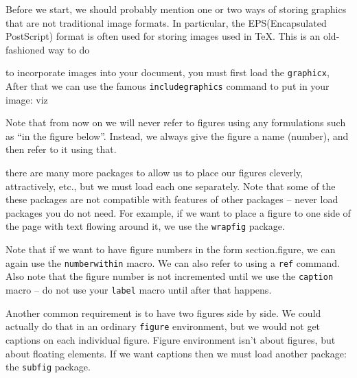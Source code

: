 \documentclass[12pt, leqno]{article}
\numberwithin{equation}{section}
\numberwithin{figure}{section}
\begin{document}
Before we start, we should probably mention one or two ways of storing graphics that are not traditional 
image formats. In particular, the EPS(Encapsulated PostScript) format is often used for storing images used in \TeX. 
This is an old-fashioned way to do 
 
to incorporate images into your document, you must first load the \texttt{graphicx}, After that we can use the famous \texttt{includegraphics} command to put in your image: viz\\
\begin{figure}[ht] %
\centering
\end{figure}

Note that from now on we will never refer to figures using any formulations such as ``in the figure below''. Instead, we always give the figure a name (number), and then refer to it using that. 

there are many more packages to allow us to place our figures cleverly, attractively, etc., but we must load each 
one separately. Note that some of the these packages are not compatible with features of other packages -- never load packages you do not need. For example, if we want to place a figure to one side of the page with text flowing around it, we use the \texttt{wrapfig} package. 


Note that if we want to have figure numbers in the form section.figure, we can again use the \texttt{numberwithin} macro. We can also refer to %
using a \texttt{ref} command. Also note that the figure number is not incremented until we use the \texttt{caption}
macro -- do not use your \texttt{label} macro until after that happens. 

Another common requirement is to have two figures side by side. We could actually do that in an ordinary \texttt{figure} environment, but we would not get captions on each individual figure. Figure environment isn't about figures, but about floating elements. If we want captions then we must load another package: the \texttt{subfig} package. 
%
\end{document}
